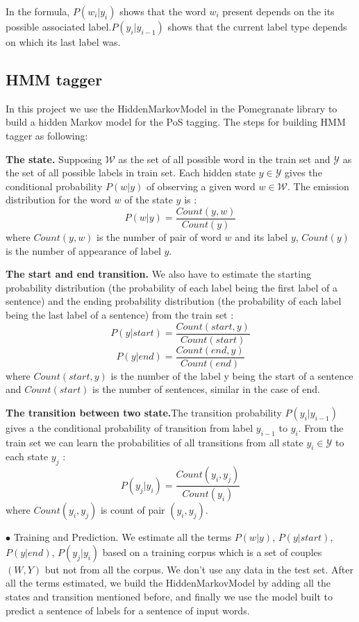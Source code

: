 \documentclass{article}
\def\WW{{\mathcal{W}}}
\def\YY{{\mathcal{Y}}}
\begin{document}
In the formula, $P(w_i|y_i)$ shows that the word $w_i$ present depends on the its possible associated label.$P(y_i|y_{i-1})$ shows that the current label type depends on which its last label was.\label{hmm notation}

\subsection{HMM tagger}
In this project we use the HiddenMarkovModel in the Pomegranate library to build a hidden Markov model for the PoS tagging. The steps for building HMM tagger as following:

\textbf{The state.} Supposing $\WW$ as the set of all possible word in the train set and $\YY$ as the set of all possible labels in train set. Each hidden state $y \in \YY$ gives the conditional probability $P(w|y)$ of observing a given word $w \in \WW$. The emission distribution for the word $w$ of the state $y$ is : $$P(w|y) = \frac{Count(y,w)}{Count(y)}$$ where $Count(y,w)$ is the number of pair of word $w$ and its label $y$, $Count(y)$ is the number of appearance of label $y$.

\textbf{The start and end transition.} We also have to estimate the starting probability distribution (the probability of each label being the first label of a sentence) and the ending probability distribution (the probability of each label being the last label of a sentence) from the train set : $$P(y|start) = \frac{Count(start, y)}{Count(start)}$$ 
$$P(y|end) = \frac{Count(end, y)}{Count(end)}$$ where $Count(start, y)$ is the number of the label y being the start of a sentence and $Count(start)$ is the number of sentences, similar in the case of end.

\textbf{The transition between two state.}The transition probability $P(y_i|y_{i-1})$ gives a the conditional probability of transition from label $y_{i-1}$ to $y_i$. From the train set we can learn the probabilities of all transitions from all state $y_i \in \YY$ to each state $y_j$ :
$$P(y_j|y_i) = \frac{Count(y_i, y_j)}{Count(y_i)}$$ where $Count(y_i, y_j)$ is count of pair $(y_i, y_j)$.

$\bullet$ Training and Prediction. We estimate all the terms $P(w|y)$, $P(y|start)$, $P(y|end)$, $P(y_j|y_i)$ based on a training corpus which is a set of couples $(W, Y)$ but not from all the corpus. We don't use any data in the test set. After all the terms estimated, we build the HiddenMarkovModel by adding all the states and transition mentioned before, and finally we use the model built to predict a sentence of labels for a sentence of input words.
\end{document}
